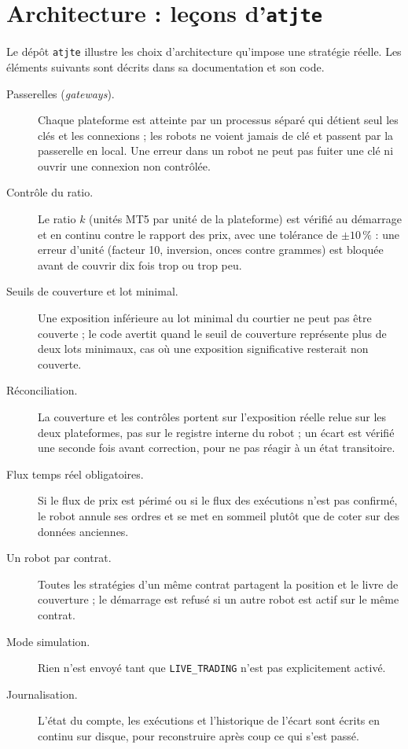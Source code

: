 \section{Architecture : leçons d'\texttt{atjte}}

Le dépôt \texttt{atjte} \citep{atjte} illustre les choix d'architecture qu'impose une stratégie réelle. Les éléments suivants sont décrits dans sa documentation et son code.

\begin{description}
\item[Passerelles (\emph{gateways}).] Chaque plateforme est atteinte par un processus séparé qui détient seul les clés et les connexions ; les robots ne voient jamais de clé et passent par la passerelle en local. Une erreur dans un robot ne peut pas fuiter une clé ni ouvrir une connexion non contrôlée.
\item[Contrôle du ratio.] Le ratio $k$ (unités MT5 par unité de la plateforme) est vérifié au démarrage et en continu contre le rapport des prix, avec une tolérance de $\pm10\,\%$ : une erreur d'unité (facteur 10, inversion, onces contre grammes) est bloquée avant de couvrir dix fois trop ou trop peu.
\item[Seuils de couverture et lot minimal.] Une exposition inférieure au lot minimal du courtier ne peut pas être couverte ; le code avertit quand le seuil de couverture représente plus de deux lots minimaux, cas où une exposition significative resterait non couverte.
\item[Réconciliation.] La couverture et les contrôles portent sur l'exposition réelle relue sur les deux plateformes, pas sur le registre interne du robot ; un écart est vérifié une seconde fois avant correction, pour ne pas réagir à un état transitoire.
\item[Flux temps réel obligatoires.] Si le flux de prix est périmé ou si le flux des exécutions n'est pas confirmé, le robot annule ses ordres et se met en sommeil plutôt que de coter sur des données anciennes.
\item[Un robot par contrat.] Toutes les stratégies d'un même contrat partagent la position et le livre de couverture ; le démarrage est refusé si un autre robot est actif sur le même contrat.
\item[Mode simulation.] Rien n'est envoyé tant que \texttt{LIVE\_TRADING} n'est pas explicitement activé.
\item[Journalisation.] L'état du compte, les exécutions et l'historique de l'écart sont écrits en continu sur disque, pour reconstruire après coup ce qui s'est passé.
\end{description}

